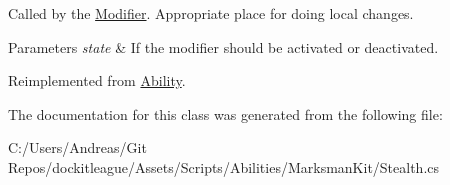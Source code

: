 Called by the \hyperlink{class_modifier}{Modifier}. Appropriate place for doing local changes. 


\begin{DoxyParams}{Parameters}
{\em state} & If the modifier should be activated or deactivated.\\
\hline
\end{DoxyParams}


Reimplemented from \hyperlink{class_ability_a18f5361c45dc334b541892880382c098}{Ability}.



The documentation for this class was generated from the following file\+:\begin{DoxyCompactItemize}
\item 
C\+:/\+Users/\+Andreas/\+Git Repos/dockitleague/\+Assets/\+Scripts/\+Abilities/\+Marksman\+Kit/Stealth.\+cs\end{DoxyCompactItemize}
